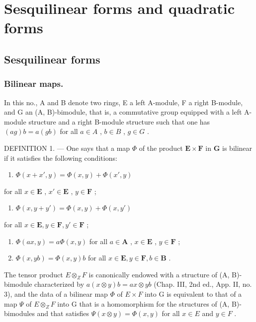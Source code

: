 \chapter{Sesquilinear forms and quadratic forms}

\section{Sesquilinear forms}

\subsection{Bilinear maps.}

In this no., A and B denote two rings, E a left A-module, F a right B-module, and G an (A, B)-bimodule, that is, a commutative group equipped with a left A-module structure and a right B-module structure such that one has \((ag)b = a(gb)\) for all \(a \in A\) , \(b \in B\) , \(g \in G\) .

DEFINITION 1. --- One says that a map \(\Phi\) of the product \(\mathbf{E} \times \mathbf{F}\) in \(\mathbf{G}\) is bilinear if it satisfies the following conditions:

\begin{enumerate}
\def\labelenumi{(\arabic{enumi})}
\tightlist
\item
  \(\Phi(x + x', y) = \Phi(x, y) + \Phi(x', y)\)
\end{enumerate}

for all \(x \in \mathbf{E}\) , \(x' \in \mathbf{E}\) , \(y \in \mathbf{F}\) ;

\begin{enumerate}
\def\labelenumi{(\arabic{enumi})}
\setcounter{enumi}{1}
\tightlist
\item
  \(\Phi(x, y + y') = \Phi(x, y) + \Phi(x, y')\)
\end{enumerate}

for all \(x \in \mathbf{E}, y \in \mathbf{F}, y' \in \mathbf{F}\) ;

\begin{enumerate}
\def\labelenumi{(\arabic{enumi})}
\setcounter{enumi}{2}
\item
  \(\Phi(ax, y) = a\Phi(x, y)\) for all \(a \in \mathbf{A}\) , \(x \in \mathbf{E}\) , \(y \in \mathbf{F}\) ;
\item
  \(\Phi(x, yb) = \Phi(x, y)b\) for all \(x \in \mathbf{E}, y \in \mathbf{F}, b \in \mathbf{B}\) .
\end{enumerate}

The tensor product \(E \otimes_{Z} F\) is canonically endowed with a structure of (A, B)-bimodule characterized by \(a(x \otimes y)b = ax \otimes yb\) (Chap. III, 2nd ed., App. II, no. 3), and the data of a bilinear map \(\Phi\) of \(E \times F\) into G is equivalent to that of a map \(\Psi\) of \(E \otimes_{Z} F\) into G that is a homomorphism for the structures of (A, B)-bimodules and that satisfies \(\Psi(x \otimes y) = \Phi(x, y)\) for all \(x \in E\) and \(y \in F\) .

